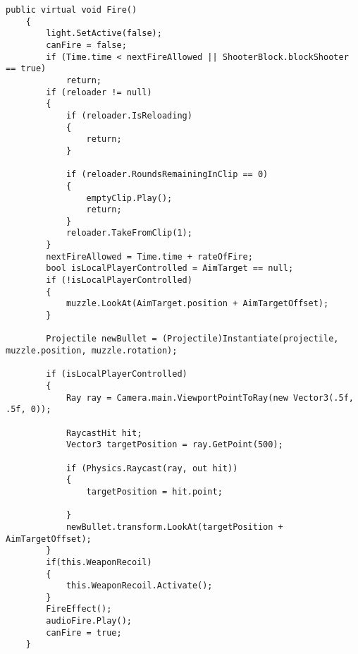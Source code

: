 \begin{lstlisting}[caption={Skripta pucanja}, label=Shooter]
public virtual void Fire()
    {
        light.SetActive(false);
        canFire = false;
        if (Time.time < nextFireAllowed || ShooterBlock.blockShooter == true)
            return;
        if (reloader != null)
        {
            if (reloader.IsReloading)
            {
                return;
            }

            if (reloader.RoundsRemainingInClip == 0)
            {
                emptyClip.Play();
                return;
            }
            reloader.TakeFromClip(1);
        }
        nextFireAllowed = Time.time + rateOfFire;
        bool isLocalPlayerControlled = AimTarget == null;
        if (!isLocalPlayerControlled)
        {
            muzzle.LookAt(AimTarget.position + AimTargetOffset);
        }

        Projectile newBullet = (Projectile)Instantiate(projectile, muzzle.position, muzzle.rotation);

        if (isLocalPlayerControlled)
        {
            Ray ray = Camera.main.ViewportPointToRay(new Vector3(.5f, .5f, 0));

            RaycastHit hit;
            Vector3 targetPosition = ray.GetPoint(500);

            if (Physics.Raycast(ray, out hit))
            {
                targetPosition = hit.point;

            }
            newBullet.transform.LookAt(targetPosition + AimTargetOffset);
        }
        if(this.WeaponRecoil)
        {
            this.WeaponRecoil.Activate();
        }
        FireEffect();
        audioFire.Play();
        canFire = true;
    }
\end{lstlisting}

